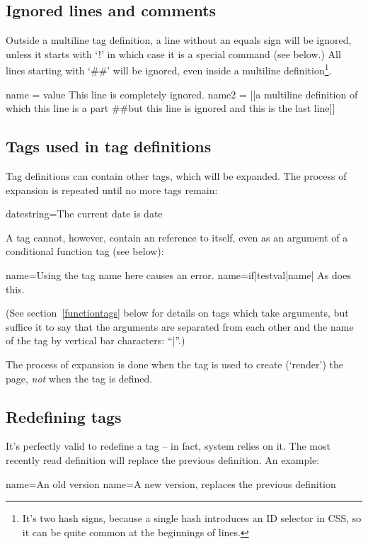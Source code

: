 \subsection{Ignored lines and comments}
Outside a multiline tag definition, a line without an equals sign will be
ignored, unless it starts with `!' in which case it is a special command (see
below.) All lines starting with `\#\#' will be ignored, even inside a
multiline definition\footnote{It's two hash signs, because a single hash
introduces an ID selector in CSS, so it can be quite common at the beginnings
of lines.}.
\begin{MyVerbatim}
 name = value
 This line is completely ignored.
 name2 = [[a multiline definition
 of which this line is a part
 ##but this line is ignored
 and this is the last line]]
\end{MyVerbatim}


\subsection{Tags used in tag definitions}
Tag definitions can contain other tags, which will be expanded. The process of
expansion is repeated until no more tags remain:
\begin{MyVerbatim}
 datestring=The current date is {{date}}
\end{MyVerbatim}

A tag cannot, however, contain an reference to itself, even as an argument of
a conditional function tag (see below):
\begin{MyVerbatim}
 name=Using the tag {{name}} here causes an error.
 name={{if|{{testval}}|{{name}}|}} As does this.
\end{MyVerbatim}
(See section~\ref{functiontags} below for details on tags which take arguments, but suffice it
to say that the arguments are separated from each other and the name of the tag by vertical bar characters:
``$\vert$''.)

The process of expansion is done when the tag is used to create (`render') the
page, \emph{not} when the tag is defined.

\subsection{Redefining tags}
It's perfectly valid to redefine a tag -- in fact, system relies on it.
The most recently read definition will replace the previous definition. An example:
\begin{MyVerbatim}
 name=An old version
 name=A new version, replaces the previous definition
\end{MyVerbatim}

